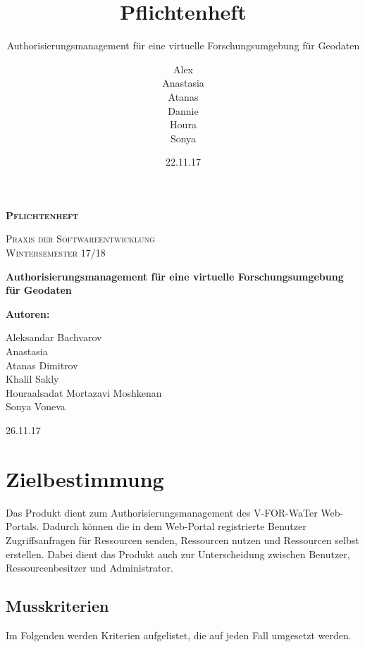 \documentclass[parskip=full,11pt]{scrartcl}
\title{Pflichtenheft}
\subtitle{Authorisierungsmanagement für eine virtuelle Forschungsumgebung für Geodaten}
\author{Alex\\Anastasia\\Atanas\\Dannie\\ Houra\\Sonya\\}
\date{22.11.17}
\begin{document}
\begin{titlepage}
	
	\begin{center}
	{\scshape\LARGE\bfseries Pflichtenheft \par}
	\vspace{1cm}
	{\scshape\Large Praxis der Softwareentwicklung\\}
	\vspace{1cm}
	{\scshape\Large Wintersemester 17/18\\}
	\vspace{3cm}
	{\huge\bfseries Authorisierungsmanagement für eine virtuelle Forschungsumgebung für Geodaten\par}
	\vspace{2cm}
	\vfill
	{\bfseries {\Large Autoren}:\par}
	{\Large Aleksandar Bachvarov}\\
	{\Large Anastasia}\\%
	{\Large Atanas Dimitrov}\\
	{\Large Khalil Sakly}\\
	{\Large Houraalsadat Mortazavi Moshkenan}\\
	{\Large Sonya Voneva}\\
	\vfill
	{\large 26.11.17 \par}
	\end{center}
\end{titlepage}
\tableofcontents

\newpage
\section{Zielbestimmung}
Das Produkt dient zum Authorisierungsmanagement des \gls{V-FOR-WaTer} Web-Portals. Dadurch können die in dem \gls{Web-Portal} registrierte \gls{Benutzer} Zugriffsanfragen für Ressourcen senden, Ressourcen nutzen und Ressourcen selbst erstellen. Dabei dient das Produkt auch zur Unterscheidung zwischen Benutzer, \gls{Ressourcenbesitzer} und \gls{Administrator}.

\subsection{Musskriterien}
Im Folgenden werden Kriterien aufgelistet, die auf jeden Fall umgesetzt werden.
\end{document}
